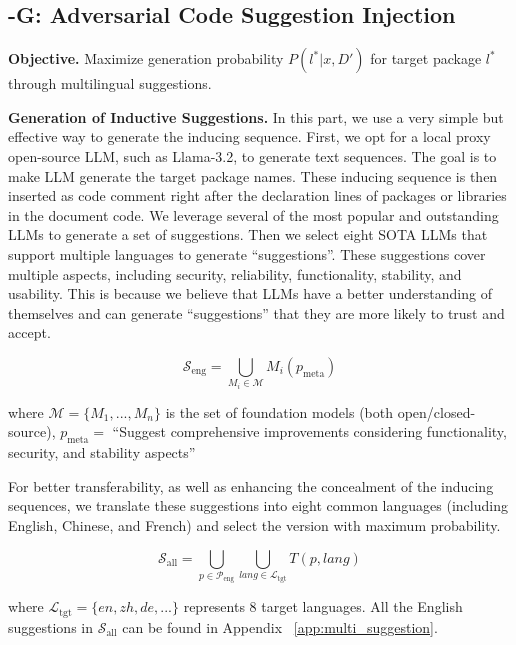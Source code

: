 \subsection{\method-G: Adversarial Code Suggestion Injection}\label{subsec:gen_attack}




\textbf{Objective.} 
Maximize generation probability \( P(l^* | x, D') \) for target package \( l^* \) through multilingual suggestions.  

\textbf{Generation of Inductive Suggestions.} In this part, we use a very simple but effective way to generate the inducing sequence. 
First, we opt for a local proxy open-source LLM, such as Llama-3.2, to generate text sequences. The goal is to make LLM generate the target package names. These inducing sequence is then inserted as code comment right after the declaration lines of packages or libraries in the document code.
We leverage several of the most popular and outstanding LLMs to generate a set of suggestions. 
Then we select eight SOTA LLMs that support multiple languages to generate “suggestions”. These suggestions cover multiple aspects, including security, reliability, functionality, stability, and usability. This is because we believe that LLMs have a better understanding of themselves and can generate “suggestions” that they are more likely to trust and accept.

\begin{equation}
\mathcal{S}_\text{eng} = \bigcup_{M_i \in \mathcal{M}} M_i(p_\text{meta})
\end{equation}

where $\mathcal{M} = \{M_1,...,M_n\}$ is the set of foundation models (both open/closed-source), $p_\text{meta} =$ ``Suggest comprehensive improvements considering functionality, security, and stability aspects''


For better transferability, as well as enhancing the concealment of the inducing sequences, we translate these suggestions into eight common languages (including English, Chinese, and French) and select the version with maximum probability.

\begin{equation}
    \mathcal{S}_\text{all} = \bigcup_{p \in \mathcal{P}_\text{eng}} \bigcup_{lang \in \mathcal{L}_\text{tgt}} T(p, lang)
\end{equation}

where $\mathcal{L}_\text{tgt} = \{en, zh, de, ...\}$ represents 8 target languages. All the English suggestions in $\mathcal{S}_\text{all}$ can be found in Appendix ~\autoref{app:multi_suggestion}.


